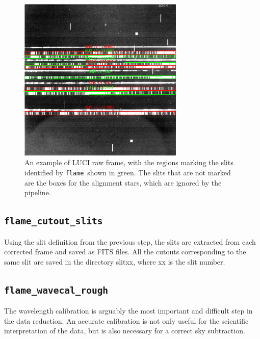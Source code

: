 \documentclass[a4paper, notitlepage]{article}
\newcommand{\flame}{\texttt{flame}}
\begin{document}
\begin{figure}[htbp]
\centering
\includegraphics[width=0.7\textwidth]{slits}
\caption{An example of LUCI raw frame, with the regions marking the slits identified by \flame\ shown in green. The slits that are not marked are the boxes for the alignment stars, which are ignored by the pipeline.}
\label{fig:slits}
\end{figure}


\subsection{\texttt{flame\_cutout\_slits}}

Using the slit definition from the previous step, the slits are extracted from each corrected frame and saved as FITS files. All the cutouts corresponding to the same slit are saved in the directory slitxx, where xx is the slit number.


\subsection{\texttt{flame\_wavecal\_rough}}

The wavelength calibration is arguably the most important and difficult step in the data reduction. An accurate calibration is not only useful for the scientific interpretation of the data, but is also necessary for a correct sky subtraction.
\end{document}
